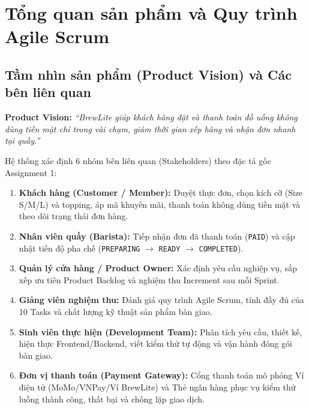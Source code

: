 \documentclass[a4paper,12pt]{article}
\begin{document}
\tableofcontents
\newpage

\section{Tổng quan sản phẩm và Quy trình Agile Scrum}

\subsection{Tầm nhìn sản phẩm (Product Vision) và Các bên liên quan}
\textbf{Product Vision:} \textit{``BrewLite giúp khách hàng đặt và thanh toán đồ uống không dùng tiền mặt chỉ trong vài chạm, giảm thời gian xếp hàng và nhận đơn nhanh tại quầy.''}

Hệ thống xác định 6 nhóm bên liên quan (Stakeholders) theo đặc tả gốc Assignment 1:
\begin{enumerate}[1.]
  \item \textbf{Khách hàng (Customer / Member):} Duyệt thực đơn, chọn kích cỡ (Size S/M/L) và topping, áp mã khuyến mãi, thanh toán không dùng tiền mặt và theo dõi trạng thái đơn hàng.
  \item \textbf{Nhân viên quầy (Barista):} Tiếp nhận đơn đã thanh toán (\texttt{PAID}) và cập nhật tiến độ pha chế (\texttt{PREPARING} $\rightarrow$ \texttt{READY} $\rightarrow$ \texttt{COMPLETED}).
  \item \textbf{Quản lý cửa hàng / Product Owner:} Xác định yêu cầu nghiệp vụ, sắp xếp ưu tiên Product Backlog và nghiệm thu Increment sau mỗi Sprint.
  \item \textbf{Giảng viên nghiệm thu:} Đánh giá quy trình Agile Scrum, tính đầy đủ của 10 Tasks và chất lượng kỹ thuật sản phẩm bàn giao.
  \item \textbf{Sinh viên thực hiện (Development Team):} Phân tích yêu cầu, thiết kế, hiện thực Frontend/Backend, viết kiểm thử tự động và vận hành đóng gói bàn giao.
  \item \textbf{Đơn vị thanh toán (Payment Gateway):} Cổng thanh toán mô phỏng Ví điện tử (MoMo/VNPay/Ví BrewLite) và Thẻ ngân hàng phục vụ kiểm thử luồng thành công, thất bại và chống lặp giao dịch.
\end{enumerate}
\end{document}
